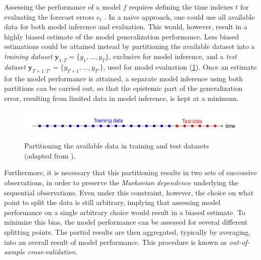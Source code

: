 Assessing the performance of a model $f$ requires defining the time indexes $t$ for evaluating the forecast errors $e_{t}$ . In a naive approach, one could use all available data for both model inference and evaluation. This would, however, result in a highly biased estimate of the model generalization performance. Less biased estimations could be attained instead by partitioning the available dataset into a \textit{training dataset} $\boldsymbol{y} _{1:T} = \{y_1,…,y_T\}$, exclusive for model inference, and a \textit{test dataset} $\boldsymbol{y} _{T+1:T'} = \{y_{T+1},…,y_{T'}\}$, used for model evaluation (\ref{fig:training_test_split}). Once an estimate for the model performance is attained, a separate model inference using both partitions can be carried out, so that the epistemic part of the generalization error, resulting from limited data in model inference, is kept at a minimum.
\begin{figure}[H]%
	\centering
    \caption{Partitioning the available data in training and test datasets (adapted from \cite{krispin2019handson}).}
    \includegraphics[scale=0.8]{traintest_split.png}
	\label{fig:training_test_split}
\end{figure}

Furthermore, it is necessary that this partitioning results in two sets of successive observations, in order to preserve the \textit{Markovian dependence} underlying the sequential observations. Even under this constraint, however, the choice on what point to split the data is still arbitrary, implying that assessing model performance on a single arbitrary choice would result in a biased estimate. To minimize this bias, the model performance can be assessed for several different splitting points. The partial results are then aggregated, typically by averaging, into an overall result of model performance. This procedure is known as \textit{out-of-sample cross-validation}.

